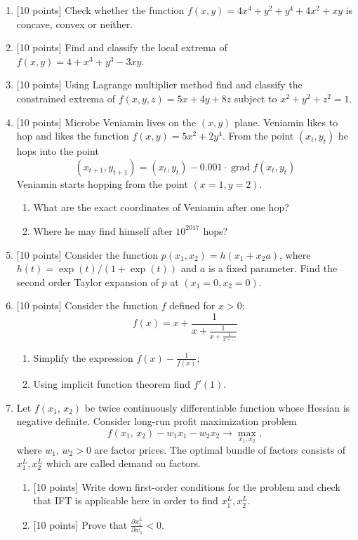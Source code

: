 \documentclass[12pt]{article} %
\theoremstyle{definition} %
\DeclareMathOperator{\grad}{grad}
\providecommand{\grad}{\mathrm{grad}\,}
\begin{document}
\begin{enumerate}
\item {[10 points]} Check whether the function $f(x,y)= 4x^4 + y^2+y^4+4x^2+xy$ is concave, convex or neither.
\item {[10 points]} Find and classify the local extrema of $f(x,y) = 4 + x^3 + y^3 - 3xy$.
\item {[10 points]} Using Lagrange multiplier method find and classify the constrained extrema of $f(x, y, z) =  5x +4y + 8z$ subject to $x^2 + y^2 + z^2 = 1$.
\item {[10 points]} Microbe Veniamin lives on the $(x, y)$ plane. Veniamin likes to hop and likes the function $f(x, y) = 5x^2 + 2y^4$. From the point $(x_t, y_t)$ he hops into the point
\[
(x_{t+1},y_{t+1})=(x_t, y_t) - 0.001\cdot \grad f(x_t, y_t)
\]
Veniamin starts hopping from the point $(x=1, y =2)$.

\begin{enumerate}
  \item What are the exact coordinates of Veniamin after one hop?
  \item Where he may find himself after $10^{2017}$ hops?
\end{enumerate}
\item {[10 points]} Consider the function $p(x_1, x_2) = h(x_1 + x_2 a)$, where $h(t) = \exp(t)/(1+\exp(t))$ and $a$ is a fixed parameter. Find the second order Taylor expansion of $p$ at $(x_1=0, x_2=0)$.

\item {[10 points]} Consider the function $f$ defined for $x>0$:
\[
f(x) = x + \frac{1}{x + \frac{1}{x + \frac{1}{x + \ldots}}}
\]
\begin{enumerate}
  \item Simplify the expression $f(x) - \frac{1}{f(x)}$;
  \item Using implicit function theorem find $f'(1)$.
\end{enumerate}

\item Let $f({x_1},\,{x_2})$ be twice continuously differentiable function whose Hessian is negative definite. Consider long-run profit maximization problem
\[
f({x_1},\,{x_2}) - {w_1}{x_1} - {w_2}{x_2} \to \max_{x_1, x_2},
\]
where ${w_1},\,{w_2} > 0$ are factor prices. The optimal bundle of factors consists of $x_1^L, x_2^L$ which are called demand on factors.
\begin{enumerate}
\item {[10 points]} Write down first-order conditions for the problem and check that IFT is applicable here in order to find $x_1^L, x_2^L$.
\item {[10 points]} Prove that $\frac{{\partial x_1^L}}{{\partial {w_1}}} < 0$.
\end{enumerate}


\end{enumerate}
\end{document}
